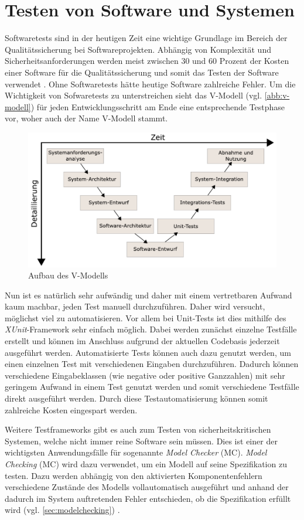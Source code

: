 \section{Testen von Software und Systemen}\label{sec:testenSoftware}

Softwaretests sind in der heutigen Zeit eine wichtige Grundlage im Bereich der Qualitätssicherung bei Softwareprojekten. Abhängig von Komplexität und Sicherheitsanforderungen werden meist zwischen 30 und 60 Prozent der Kosten einer Software für die Qualitätssicherung und somit das Testen der Software verwendet \cite{Polo2013}. Ohne Softwaretests hätte heutige Software zahlreiche Fehler. Um die Wichtigkeit von Sofwaretests zu unterstreichen sieht \zB das V-Modell (vgl. \autoref{abb:v-modell}) für jeden Entwicklungsschritt am Ende eine entsprechende Testphase vor, woher auch der Name V-Modell stammt.

\begin{figure}
	\centering
	\includegraphics[width=0.8\columnwidth]{./images/V-Modell.pdf}
	\caption[Aufbau des V-Modells]{Aufbau des V-Modells \cite{abb:vmodell}}
	\label{abb:v-modell}
\end{figure}

Nun ist es natürlich sehr aufwändig und daher mit einem vertretbaren Aufwand kaum machbar, jeden Test manuell durchzuführen. Daher wird versucht, möglichst viel zu automatisieren. Vor allem bei Unit-Tests ist dies mithilfe des \emph{XUnit}-Framework sehr einfach möglich. Dabei werden zunächst einzelne Testfälle erstellt und können im Anschluss aufgrund der aktuellen Codebasis jederzeit ausgeführt werden. Automatisierte Tests können auch dazu genutzt werden, um einen einzelnen Test mit verschiedenen Eingaben durchzuführen. Dadurch können verschiedene Eingabeklassen (wie negative oder positive Ganzzahlen) mit sehr geringem Aufwand in einem Test genutzt werden und somit verschiedene Testfälle direkt ausgeführt werden. Durch diese Testautomatisierung können somit zahlreiche Kosten eingespart werden.

Weitere Testframeworks gibt es auch zum Testen von sicherheitskritischen Systemen, welche nicht immer reine Software sein müssen. Dies ist einer der wichtigsten Anwendungsfälle für sogenannte \emph{Model Checker} (MC). \emph{Model Checking} (MC) wird dazu verwendet, um ein Modell auf seine Spezifikation zu testen. Dazu werden abhängig von den aktivierten Komponentenfehlern verschiedene Zustände des Modells vollautomatisch ausgeführt und anhand der dadurch im System auftretenden Fehler entschieden, ob die Spezifikation erfüllt wird (vgl. \autoref{sec:modelchecking}) \cite{Grumberg1999,Habermaier2015}.